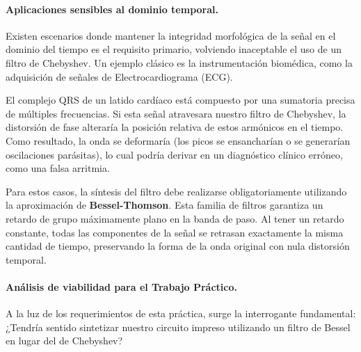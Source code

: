 \paragraph{Aplicaciones sensibles al dominio temporal.}
Existen escenarios donde mantener la integridad morfológica de la señal en el dominio del tiempo es el requisito primario, volviendo inaceptable el uso de un filtro de Chebyshev. Un ejemplo clásico es la instrumentación biomédica, como la adquisición de señales de Electrocardiograma (ECG). 

El complejo QRS de un latido cardíaco está compuesto por una sumatoria precisa de múltiples frecuencias. Si esta señal atravesara nuestro filtro de Chebyshev, la distorsión de fase alteraría la posición relativa de estos armónicos en el tiempo. Como resultado, la onda se deformaría (los picos se ensancharían o se generarían oscilaciones parásitas), lo cual podría derivar en un diagnóstico clínico erróneo, como una falsa arritmia. 

Para estos casos, la síntesis del filtro debe realizarse obligatoriamente utilizando la aproximación de \textbf{Bessel-Thomson}. Esta familia de filtros garantiza un retardo de grupo máximamente plano en la banda de paso. Al tener un retardo constante, todas las componentes de la señal se retrasan exactamente la misma cantidad de tiempo, preservando la forma de la onda original con nula distorsión temporal.

\paragraph{Análisis de viabilidad para el Trabajo Práctico.}
A la luz de los requerimientos de esta práctica, surge la interrogante fundamental: ¿Tendría sentido sintetizar nuestro circuito impreso utilizando un filtro de Bessel en lugar del de Chebyshev?


